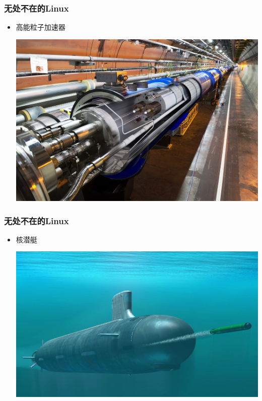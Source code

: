 \documentclass[xcolor=svgnames,presentation]{beamer}
\begin{document}
\begin{frame}
\frametitle{无处不在的Linux}
\label{sec-2-4-9}
\begin{itemize}

\item 高能粒子加速器
\label{sec-2-4-9-1}%
\begin{center}
\includegraphics[width=.9\linewidth]{img/jiasuqi.jpg}
\end{center}

\end{itemize} %
\end{frame}
\begin{frame}
\frametitle{无处不在的Linux}
\label{sec-2-4-10}
\begin{itemize}

\item 核潜艇
\label{sec-2-4-10-1}%
\begin{center}
\includegraphics[width=.9\linewidth]{img/nuclear.jpg}
\end{center}

\end{itemize} %
\end{frame}
\end{document}
